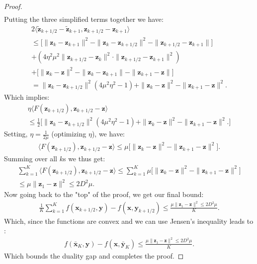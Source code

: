 \begin{proof}
\begin{align*}
\end{align*}
Putting the three simplified terms together we have:
\begin{align*}
    2\langle{\tilde{\bm{z}}_{k+1/2}-\tilde{\bm{z}}_{k+1}}, \bm{z}_{k+1/2} -\bm{z}_{k+1} \rangle \\
    \leq
    \Big[ \| \bm{z}_k-{\bm{z}}_{k+1}\|^2 - \|  \bm{z}_k-{\bm{z}}_{k+1/2}\|^2 - \|  \bm{z}_{k+1/2}-{\bm{z}}_{k+1}\| \Big] \\+
    (4 \eta^2 \mu^2 \| \bm{z}_{k+1/2} - \bm{z}_{k} \|^2 \cdot \| \bm{z}_{k+1/2} -\bm{z}_{k+1} \|^2 )  \\+
    \Big[ \| \bm{z}_k-{\bm{z}}\|^2 - \|  \bm{z}_k-{\bm{z}}_{k+1}\| - \|  \bm{z}_{k+1}-{\bm{z}}\| \Big]\\
    = \|\bm{z}_{k} -\bm{z}_{k+1/2} \|^2(4\mu^2 \eta^2 -1) + \|\bm{z}_k-\bm{z}\|^2 - \|\bm{z}_{k+1} - \bm{z} \|^2.
\end{align*}
Which implies:
\begin{align*}
    \eta \langle F(\bm{z}_{k+1/2}), \bm{z}_{k+1/2} -\bm{z} \rangle \\
    \leq \frac{1}{2} \Big[ 
        \|\bm{z}_{k} -\bm{z}_{k+1/2} \|^2(4\mu^2 \eta^2 -1) + \|\bm{z}_k-\bm{z}\|^2 - \|\bm{z}_{k+1} - \bm{z} \|^2.
    \Big]
\end{align*}
Setting, $\eta = \frac{1}{2\mu}$ (optimizing $\eta$), we have:
\begin{align*}
     \langle F(\bm{z}_{k+1/2}), \bm{z}_{k+1/2} -\bm{z} \rangle 
    \leq \mu \Big[ 
        \|\bm{z}_k-\bm{z}\|^2 - \|\bm{z}_{k+1} - \bm{z} \|^2
    \Big].
\end{align*}
Summing over all $k$s we thus get:
\begin{align*}
    \sum^K_{k=1}  \langle F(\bm{z}_{k+1/2}), \bm{z}_{k+1/2} -\bm{z} \rangle  
    \leq \sum^K_{k=1}  \mu \Big[ 
        \|\bm{z}_k-\bm{z}\|^2 - \|\bm{z}_{k+1} - \bm{z} \|^2
    \Big]\\
    \leq \mu \|\bm{z}_1-\bm{z}\|^2 \leq 2D^2\mu.  
\end{align*}
Now going back to the "top" of the proof, we get our final bound:
\begin{align*}
    \frac{1}{K} \sum_{k=1}^K f(\bm{x}_{k+1/2},\bm{y}) - f(\bm{x},\bm{y}_{k+1/2}) \leq \frac{ \mu \|\bm{z}_1-\bm{z}\|^2 \leq 2D^2\mu}{K}.
\end{align*}
Which, since the functions are convex and we can use Jensen's inequality leads to :
\begin{align*}
    f(\bar{\bm{x}}_{K},\bm{y}) - f(\bm{x},\bar{\bm{y}}_{K}) \leq \frac{ \mu \|\bm{z}_1-\bm{z}\|^2 \leq 2D^2\mu}{K}.
\end{align*}
Which bounds the duality gap and completes the proof.
\end{proof} 


